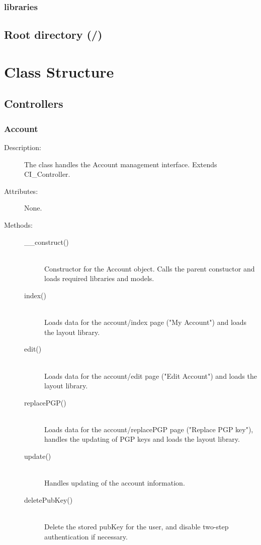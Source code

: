 \documentclass[11pt]{article} %
\begin{document}
\subsubsection*{libraries}
\subsection{Root directory (/)}
\newpage

\section{Class Structure}
\subsection{Controllers}
\subsubsection{Account}
\begin{description}
\item[Description:] The class handles the Account management interface. Extends CI\_Controller.
\item[Attributes:] None.
\item[Methods:] \textbf{ }
\begin{description}
\item[\_\_construct()]  \textbf{ }\\
Constructor for the Account object. Calls the parent constuctor and loads required libraries and models.
\item[index()]  \textbf{ }\\
Loads data for the account/index page ("My Account") and loads the layout library.
\item[edit()]  \textbf{ }\\
Loads data for the account/edit page ("Edit Account") and loads the layout library.
\item[replacePGP()]  \textbf{ }\\
Loads data for the account/replacePGP page ("Replace PGP key"), handles the updating of PGP keys and loads the layout library.
\item[update()]  \textbf{ } \\
Handles updating of the account information.
\item[deletePubKey()]  \textbf{ }\\
Delete the stored pubKey for the user, and disable two-step authentication if necessary.
\end{description} 
\end{description} 
\end{document}
